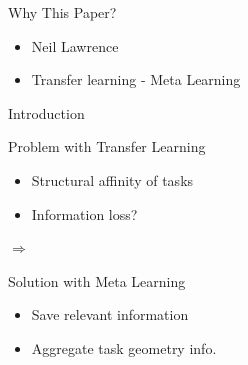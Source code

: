 \documentclass[aspectratio=169]{beamer}
\author{\authorlabel}
\renewcommand{\cite}[1]{\footnote<.->[frame]{\fullcite{#1}}}
\newcommand{\mysubtitle}{\color{Pink}\Large{\textbf{Transfering Knowledge Across Learning Processes}}}
\begin{document}
{

\def\beamer@entrycode{\vspace*{-\headheight}}
}



\begin{frame}{Why This Paper?}
	\centering
	\begin{minipage}{0.5\textwidth}
		\begin{itemize}
			\item Neil Lawrence
			\item Transfer learning - Meta Learning
		\end{itemize}	
	\end{minipage}%
	\begin{minipage}{0.5\textwidth}
	\end{minipage}
\end{frame}

\begin{frame}{Introduction}
	\centering
	\begin{minipage}{0.4\textwidth}
		\begin{block}{\color{White} Problem with Transfer Learning}
			\begin{itemize}
				\item Structural affinity of tasks
				\item Information loss?
			\end{itemize}	
		\end{block}
	\end{minipage}%
	\hspace{1cm} $\Longrightarrow$ \hspace{1cm}
	\begin{minipage}{0.4\textwidth}
		\begin{block}{\color{White}Solution with Meta Learning}
			\begin{itemize}
				\item Save relevant information 
				\item Aggregate task geometry info.
			\end{itemize}	
		\end{block}
	\end{minipage}
\end{frame}
\end{document}
